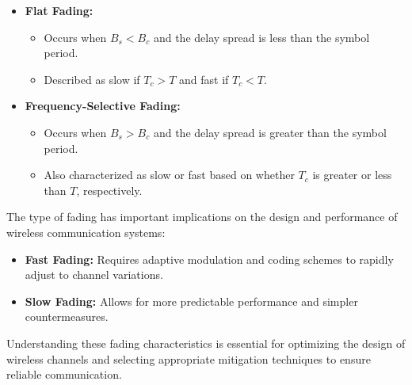 \begin{itemize}
    \item \textbf{Flat Fading:}
    \begin{itemize}
        \item Occurs when \(B_s < B_c\) and the delay spread is less than the symbol period.
        \item Described as slow if \(T_c > T\) and fast if \(T_c < T\).
    \end{itemize}
    \item \textbf{Frequency-Selective Fading:}
    \begin{itemize}
        \item Occurs when \(B_s > B_c\) and the delay spread is greater than the symbol period.
        \item Also characterized as slow or fast based on whether \(T_c\) is greater or less than \(T\), respectively.
    \end{itemize}
\end{itemize}

The type of fading has important implications on the design and performance of wireless communication systems:

\begin{itemize}
    \item \textbf{Fast Fading:} Requires adaptive modulation and coding schemes to rapidly adjust to channel variations.
    \item \textbf{Slow Fading:} Allows for more predictable performance and simpler countermeasures.
\end{itemize}
Understanding these fading characteristics is essential for optimizing the design of wireless channels and selecting appropriate mitigation techniques to ensure reliable communication.



